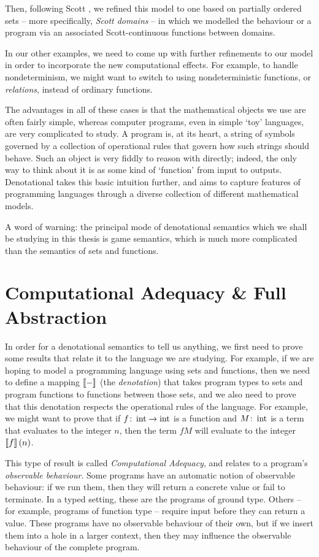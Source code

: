 Then, following Scott \cite{ScottDomains}, we refined this model to one based on partially ordered sets -- more specifically, \emph{Scott domains} -- in which we modelled the behaviour or a program via an associated Scott-continuous functions between domains.

In our other examples, we need to come up with further refinements to our model in order to incorporate the new computational effects. 
For example, to handle nondeterminism, we might want to switch to using nondeterministic functions, or \emph{relations}, instead of ordinary functions.

The advantages in all of these cases is that the mathematical objects we use are often fairly simple, whereas computer programs, even in simple `toy' languages, are very complicated to study. 
A program is, at its heart, a string of symbols governed by a collection of operational rules that govern how such strings should behave. 
Such an object is very fiddly to reason with directly; indeed, the only way to think about it is as some kind of `function' from input to outputs.
Denotational takes this basic intuition further, and aims to capture features of programming languages through a diverse collection of different mathematical models.

A word of warning: the principal mode of denotational semantics which we shall be studying in this thesis is game semantics, which is much more complicated than the semantics of sets and functions. 

\section{Computational Adequacy \& Full Abstraction}
\label{SecCAnFA}

In order for a denotational semantics to tell us anything, we first need to prove some results that relate it to the language we are studying. 
For example, if we are hoping to model a programming language using sets and functions, then we need to define a mapping $\left\llbracket-\right\rrbracket$ (the \emph{denotation}) that takes program types to sets and program functions to functions between those sets, and we also need to prove that this denotation respects the operational rules of the language.  
For example, we might want to prove that if $f \colon \operatorname{int} \to \operatorname{int}$ is a function and $M \colon \operatorname{int}$ is a term that evaluates to the integer $n$, then the term $f M$ will evaluate to the integer $\left\llbracket f\right\rrbracket(n)$.

This type of result is called \emph{Computational Adequacy}, and relates to a program's \emph{observable behaviour}.  
Some programs have an automatic notion of observable behaviour: if we run them, then they will return a concrete value or fail to terminate.  
In a typed setting, these are the programs of ground type.
Others -- for example, programs of function type -- require input before they can return a value.  
These programs have no observable behaviour of their own, but if we insert them into a hole in a larger context, then they may influence the observable behaviour of the complete program.

